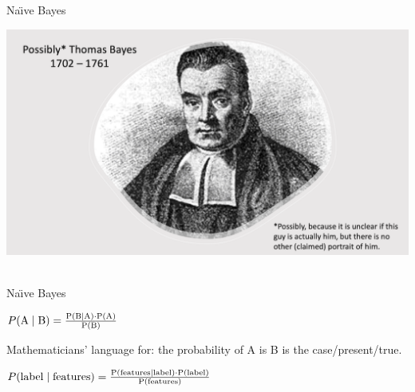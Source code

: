 \documentclass[handout]{beamer}
\begin{document}
\begin{frame}{Na\"{\i}ve Bayes}
	
	\begin{center}
		\includegraphics[width=\linewidth,height=\textheight,keepaspectratio]{../pictures/ThomasBayes.png} \\\
	\end{center}
	
	
	
	
\end{frame}



\begin{frame}{Na\"{\i}ve Bayes}
	
	$ P(\rm{A} \mid \rm{B}) = \frac{P(\rm{B} \mid \rm{A}) \cdot P(\rm{A})}{P(\rm{B})} $
	
	Mathematicians’ language for: the probability of A is B is the case/present/true. 
	
	$ P(\rm{label} \mid \rm{features}) = \frac{P(\rm{features} \mid \rm{label}) \cdot P(\rm{label})}{P(\rm{features})} $
	
	
	
	
	
\end{frame}
\end{document}
